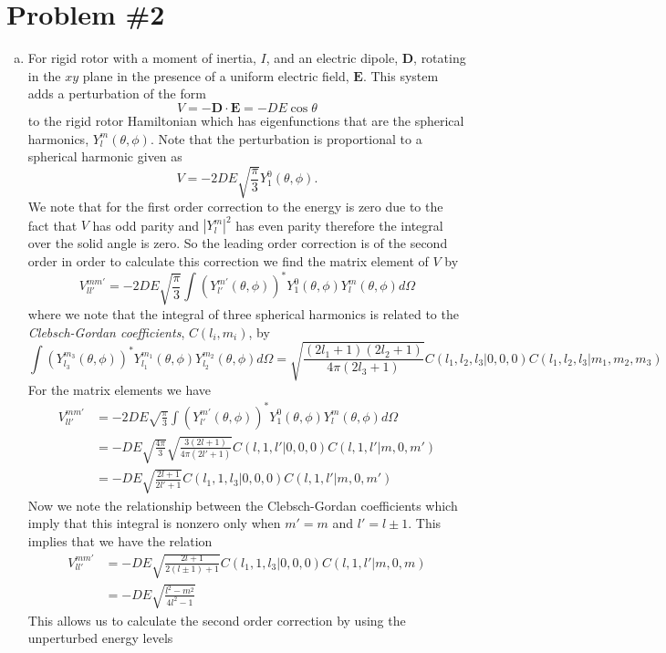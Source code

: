 \documentclass[11pt]{article}
\numberwithin{equation}{section}
\begin{document}
\section{Problem \#2}
\begin{enumerate}[(a)]
\item
For rigid rotor with a moment of inertia, $I$, and an electric dipole, $\mathbf{D}$, rotating
in the $xy$ plane in the presence of a uniform electric field, $\mathbf{E}$. This system adds
a perturbation of the form
$$V = -\mathbf{D}\cdot\mathbf{E} = -DE\cos\theta$$
to the rigid rotor Hamiltonian which has eigenfunctions that are the spherical harmonics, 
$Y_l^m(\theta,\phi)$. Note that the perturbation is proportional to a spherical harmonic 
given as
$$V = -2DE\sqrt{\frac{\pi}{3}}Y_{1}^{0}(\theta,\phi).$$
We note that for the first order correction to the energy is zero due to the fact that $V$ 
has odd parity and $|Y_l^{m}|^2$ has even parity therefore the integral over the solid angle
is zero. So the leading order correction is of the second order in order to calculate this
correction we find the matrix element of $V$ by
$$V_{ll'}^{mm'} = -2DE\sqrt{\frac{\pi}{3}}\int{\left(Y_{l'}^{m'}(\theta,\phi)\right)^*}Y_{1}^{0}(\theta,\phi){Y_{l}^{m}(\theta,\phi)}d\Omega$$
where we note that the integral of three spherical harmonics is related to the 
\emph{Clebsch-Gordan coefficients}, $C(l_i,m_i)$, by
$$\int{\left(Y_{l_3}^{m_3}(\theta,\phi)\right)^*}{Y_{l_1}^{m_1}(\theta,\phi)}{Y_{l_2}^{m_2}(\theta,\phi)}d\Omega = \sqrt{\frac{(2l_1+1)(2l_2+1)}{4\pi(2l_3+1)}}C(l_1,l_2,l_3|0,0,0)C(l_1,l_2,l_3|m_1,m_2,m_3)$$
For the matrix elements we have
\begin{align*}
V_{ll'}^{mm'} &= -2DE\sqrt{\frac{\pi}{3}}\int{\left(Y_{l'}^{m'}(\theta,\phi)\right)^*}Y_{1}^{0}(\theta,\phi){Y_{l}^{m}(\theta,\phi)}d\Omega\\
&= -DE\sqrt{\frac{4\pi}{3}}\sqrt{\frac{3(2l+1)}{4\pi(2l'+1)}}C(l,1,l'|0,0,0)C(l,1,l'|m,0,m')\\
&= -DE\sqrt{\frac{2l+1}{2l'+1}}C(l_1,1,l_3|0,0,0)C(l,1,l'|m,0,m')
\end{align*}
Now we note the relationship between the Clebsch-Gordan coefficients which imply that this 
integral is nonzero only when $m'=m$ and $l'=l\pm{1}$. This implies that we have the relation
\begin{align*}
V_{ll'}^{mm'} &= -DE\sqrt{\frac{2l+1}{2(l\pm1)+1}}C(l_1,1,l_3|0,0,0)C(l,1,l'|m,0,m)\\
&= -DE\sqrt{\frac{l^2-m^2}{4l^2-1}}
\end{align*}
This allows us to calculate the second order correction by using the unperturbed energy levels

\end{enumerate}
\end{document}
